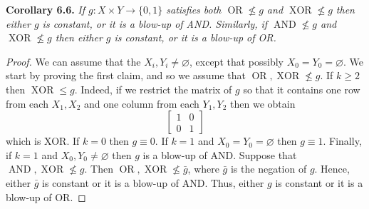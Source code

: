 \documentclass[10pt,a4paper]{article}
\newcommand{\bits}{\{0,1\}}
\newcommand{\OR}{\operatorname{OR}}
\newcommand{\AND}{\operatorname{AND}}
\newcommand{\XOR}{\operatorname{XOR}}
\newenvironment{originalresult}[1]{\par\medskip\noindent\textbf{#1.}\itshape}{\par\medskip}
\begin{document}
\begin{originalresult}{Corollary 6.6}
If $g:X\times Y\to\bits$ satisfies both $\OR\nleq g$ and $\XOR\nleq g$ then either $g$ is constant, or it is a blow-up of AND. Similarly, if $\AND\nleq g$ and $\XOR\nleq g$ then either $g$ is constant, or it is a blow-up of OR.
\end{originalresult}
\begin{proof}
We can assume that the $X_i,Y_i\ne\varnothing$, except that possibly $X_0=Y_0=\varnothing$. We start by proving the first claim, and so we assume that $\OR,\XOR\nleq g$.
If $k\ge2$ then $\XOR\le g$. Indeed, if we restrict the matrix of $g$ so that it contains one row from each $X_1,X_2$ and one column from each $Y_1,Y_2$ then we obtain
\[\begin{bmatrix}1&0\\0&1\end{bmatrix}\]
which is XOR. If $k=0$ then $g\equiv0$. If $k=1$ and $X_0=Y_0=\varnothing$ then $g\equiv1$. Finally, if $k=1$ and $X_0,Y_0\ne\varnothing$ then $g$ is a blow-up of AND.
Suppose that $\AND,\XOR\nleq g$. Then $\OR,\XOR\nleq\bar g$, where $\bar g$ is the negation of $g$. Hence, either $\bar g$ is constant or it is a blow-up of AND. Thus, either $g$ is constant or it is a blow-up of OR.
\end{proof}
\end{document}
